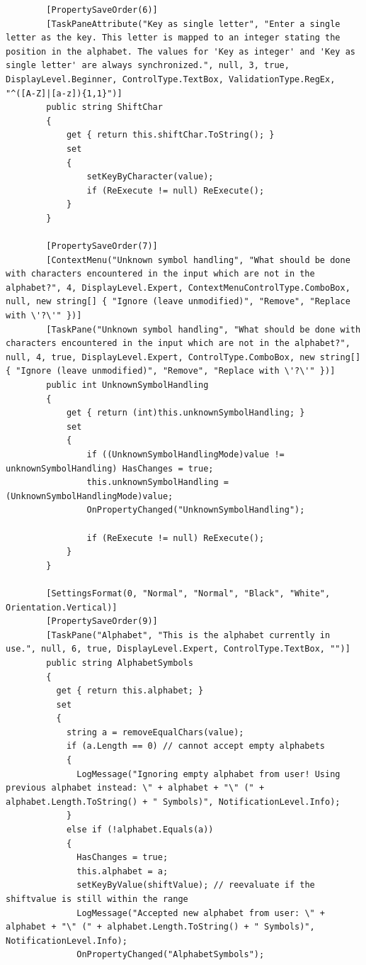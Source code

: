 \begin{lstlisting}
        [PropertySaveOrder(6)]
        [TaskPaneAttribute("Key as single letter", "Enter a single letter as the key. This letter is mapped to an integer stating the position in the alphabet. The values for 'Key as integer' and 'Key as single letter' are always synchronized.", null, 3, true, DisplayLevel.Beginner, ControlType.TextBox, ValidationType.RegEx, "^([A-Z]|[a-z]){1,1}")]
        public string ShiftChar
        {
            get { return this.shiftChar.ToString(); }
            set
            {
                setKeyByCharacter(value);
                if (ReExecute != null) ReExecute();
            }
        }

        [PropertySaveOrder(7)]
        [ContextMenu("Unknown symbol handling", "What should be done with characters encountered in the input which are not in the alphabet?", 4, DisplayLevel.Expert, ContextMenuControlType.ComboBox, null, new string[] { "Ignore (leave unmodified)", "Remove", "Replace with \'?\'" })]
        [TaskPane("Unknown symbol handling", "What should be done with characters encountered in the input which are not in the alphabet?", null, 4, true, DisplayLevel.Expert, ControlType.ComboBox, new string[] { "Ignore (leave unmodified)", "Remove", "Replace with \'?\'" })]
        public int UnknownSymbolHandling
        {
            get { return (int)this.unknownSymbolHandling; }
            set
            {
                if ((UnknownSymbolHandlingMode)value != unknownSymbolHandling) HasChanges = true;
                this.unknownSymbolHandling = (UnknownSymbolHandlingMode)value;
                OnPropertyChanged("UnknownSymbolHandling");

                if (ReExecute != null) ReExecute();
            }
        }

        [SettingsFormat(0, "Normal", "Normal", "Black", "White", Orientation.Vertical)]
        [PropertySaveOrder(9)]
        [TaskPane("Alphabet", "This is the alphabet currently in use.", null, 6, true, DisplayLevel.Expert, ControlType.TextBox, "")]
        public string AlphabetSymbols
        {
          get { return this.alphabet; }
          set
          {
            string a = removeEqualChars(value);
            if (a.Length == 0) // cannot accept empty alphabets
            {
              LogMessage("Ignoring empty alphabet from user! Using previous alphabet instead: \" + alphabet + "\" (" + alphabet.Length.ToString() + " Symbols)", NotificationLevel.Info);
            }
            else if (!alphabet.Equals(a))
            {
              HasChanges = true;
              this.alphabet = a;
              setKeyByValue(shiftValue); // reevaluate if the shiftvalue is still within the range
              LogMessage("Accepted new alphabet from user: \" + alphabet + "\" (" + alphabet.Length.ToString() + " Symbols)", NotificationLevel.Info);
              OnPropertyChanged("AlphabetSymbols");


\end{lstlisting}
